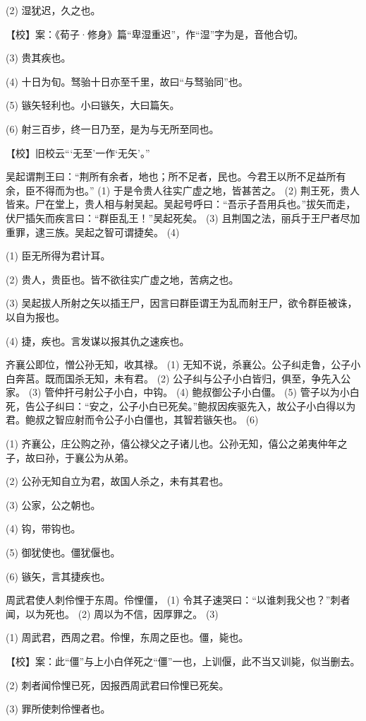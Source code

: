 \documentclass[12pt,UTF8]{ctexbook}
\begin{document}
(2) 湿犹迟，久之也。

【校】案：《荀子·修身》篇“卑湿重迟”，作“湿”字为是，音他合切。

(3) 贵其疾也。

(4) 十日为旬。驽骀十日亦至千里，故曰“与驽骀同”也。

(5) 镞矢轻利也。小曰镞矢，大曰篇矢。

(6) 射三百步，终一日乃至，是为与无所至同也。

【校】旧校云“‘无至’一作‘无矢’。”

吴起谓荆王曰：“荆所有余者，地也；所不足者，民也。今君王以所不足益所有余，臣不得而为也。” (1) 于是令贵人往实广虚之地，皆甚苦之。 (2) 荆王死，贵人皆来。尸在堂上，贵人相与射吴起。吴起号呼曰：“吾示子吾用兵也。”拔矢而走，伏尸插矢而疾言曰：“群臣乱王！”吴起死矣。 (3) 且荆国之法，丽兵于王尸者尽加重罪，逮三族。吴起之智可谓捷矣。 (4)

(1) 臣无所得为君计耳。

(2) 贵人，贵臣也。皆不欲往实广虚之地，苦病之也。

(3) 吴起拔人所射之矢以插王尸，因言曰群臣谓王为乱而射王尸，欲令群臣被诛，以自为报也。

(4) 捷，疾也。言发谋以报其仇之速疾也。

齐襄公即位，憎公孙无知，收其禄。 (1) 无知不说，杀襄公。公子纠走鲁，公子小白奔莒。既而国杀无知，未有君。 (2) 公子纠与公子小白皆归，俱至，争先入公家。 (3) 管仲扞弓射公子小白，中钩。 (4) 鲍叔御公子小白僵。 (5) 管子以为小白死，告公子纠曰：“安之，公子小白已死矣。”鲍叔因疾驱先入，故公子小白得以为君。鲍叔之智应射而令公子小白僵也，其智若镞矢也。 (6)

(1) 齐襄公，庄公购之孙，僖公禄父之子诸儿也。公孙无知，僖公之弟夷仲年之子，故曰孙，于襄公为从弟。

(2) 公孙无知自立为君，故国人杀之，未有其君也。

(3) 公家，公之朝也。

(4) 钩，带钩也。

(5) 御犹使也。僵犹偃也。

(6) 镞矢，言其捷疾也。

周武君使人刺伶悝于东周。伶悝僵， (1) 令其子速哭曰：“以谁刺我父也？”刺者闻，以为死也。 (2) 周以为不信，因厚罪之。 (3)

(1) 周武君，西周之君。伶悝，东周之臣也。僵，毙也。

【校】案：此“僵”与上小白佯死之“僵”一也，上训偃，此不当又训毙，似当删去。

(2) 刺者闻伶悝已死，因报西周武君曰伶悝已死矣。

(3) 罪所使刺伶悝者也。
\end{document}
